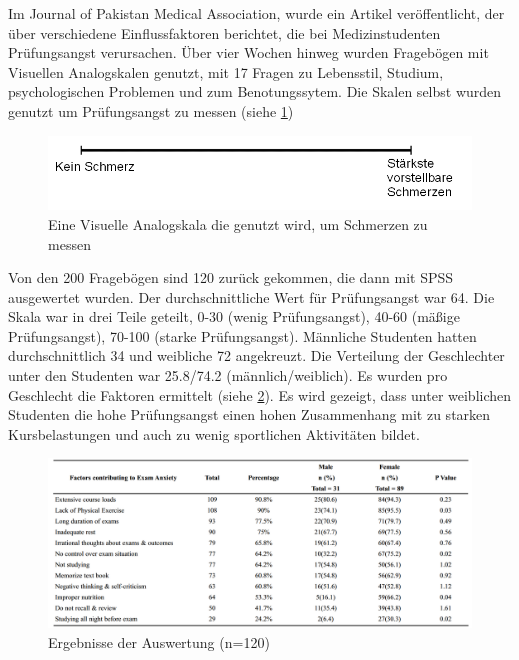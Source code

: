 \documentclass[11pt, a4paper]{article}
\begin{document}
	Im Journal of Pakistan Medical Association, wurde ein Artikel veröffentlicht, der über verschiedene Einflussfaktoren berichtet, die bei Medizinstudenten Prüfungsangst verursachen. Über vier Wochen hinweg wurden Fragebögen mit Visuellen Analogskalen genutzt, mit 17 Fragen zu Lebensstil, Studium, psychologischen Problemen und zum Benotungssytem. Die Skalen selbst wurden genutzt um Prüfungsangst zu messen (siehe \cref{fig:vas}) \cite{hashmat2008factors}

	\begin{figure}[p]
		\centering
		\includegraphics{img/VAS.png}
		\caption{Eine Visuelle Analogskala die genutzt wird, um Schmerzen zu messen \cite{hashmat2008factors}}
		\label{fig:vas}
	\end{figure}

	Von den 200 Fragebögen sind 120 zurück gekommen, die dann mit SPSS ausgewertet wurden. Der durchschnittliche Wert für Prüfungsangst war 64. Die Skala war in drei Teile geteilt, 0-30 (wenig Prüfungsangst), 40-60 (mäßige Prüfungsangst), 70-100 (starke Prüfungsangst). Männliche Studenten hatten durchschnittlich 34 und weibliche 72 angekreuzt. Die Verteilung der Geschlechter unter den Studenten war 25.8/74.2 (männlich/weiblich). Es wurden pro Geschlecht die Faktoren ermittelt (siehe \cref{fig:jpmatable}). Es wird gezeigt, dass unter weiblichen Studenten die hohe Prüfungsangst einen hohen Zusammenhang mit zu starken Kursbelastungen und auch zu wenig sportlichen Aktivitäten bildet. \cite{hashmat2008factors}

	\begin{figure}[p]
		\centering
		\includegraphics[scale=0.5]{img/jpma_table.png}
		\caption{Ergebnisse der Auswertung (n=120) \cite{hashmat2008factors}}
		\label{fig:jpmatable}
	\end{figure}
\end{document}
